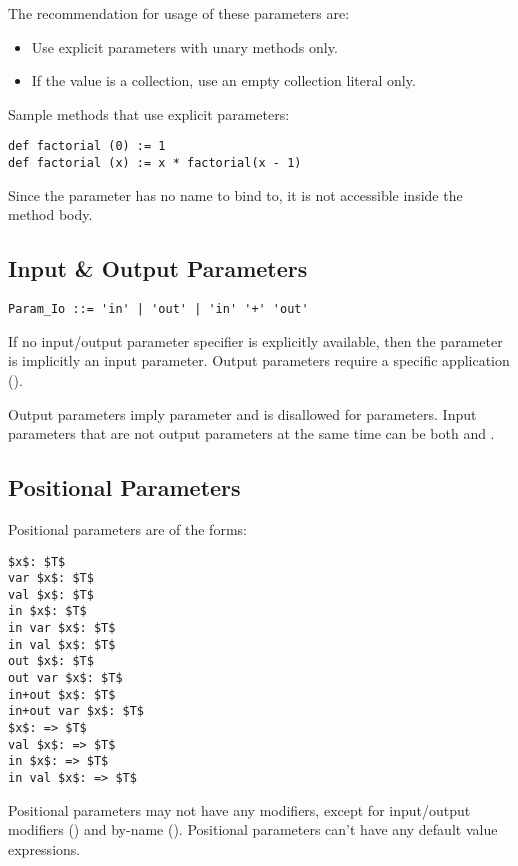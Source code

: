 The recommendation for usage of these parameters are: 
\begin{itemize}
\item Use explicit parameters with unary methods only. 
\item If the value is a collection, use an empty collection literal only. 
\end{itemize}

\example Sample methods that use explicit parameters:
\begin{lstlisting}
def factorial (0) := 1
def factorial (x) := x * factorial(x - 1)
\end{lstlisting}

Since the parameter has no name to bind to, it is not accessible inside the method body. 

\subsection{Input \& Output Parameters}
\label{sec:io-parameters}

\syntax\begin{lstlisting}
Param_Io ::= 'in' | 'out' | 'in' '+' 'out'
\end{lstlisting}

If no input/output parameter specifier is explicitly available, then the parameter is implicitly an input parameter. Output parameters require a specific application ().

Output parameters imply  parameter and is disallowed for  parameters. Input parameters that are not output parameters at the same time can be both  and . 

\subsection{Positional Parameters}
\label{sec:positional-parameters}

Positional parameters are of the forms:
\begin{lstlisting}
$x$: $T$
var $x$: $T$
val $x$: $T$
in $x$: $T$
in var $x$: $T$
in val $x$: $T$
out $x$: $T$
out var $x$: $T$
in+out $x$: $T$
in+out var $x$: $T$
$x$: => $T$
val $x$: => $T$
in $x$: => $T$
in val $x$: => $T$
\end{lstlisting}

Positional parameters may not have any modifiers, except for input/output modifiers () and by-name (). Positional parameters can't have any default value expressions. 

